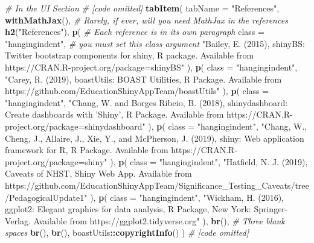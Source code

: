 \documentclass[
]{book}
\newenvironment{Shaded}{\begin{snugshade}}{\end{snugshade}}
\newcommand{\CommentTok}[1]{\textcolor[rgb]{0.56,0.35,0.01}{\textit{#1}}}
\newcommand{\DataTypeTok}[1]{\textcolor[rgb]{0.13,0.29,0.53}{#1}}
\newcommand{\KeywordTok}[1]{\textcolor[rgb]{0.13,0.29,0.53}{\textbf{#1}}}
\newcommand{\NormalTok}[1]{#1}
\newcommand{\OperatorTok}[1]{\textcolor[rgb]{0.81,0.36,0.00}{\textbf{#1}}}
\newcommand{\StringTok}[1]{\textcolor[rgb]{0.31,0.60,0.02}{#1}}
\begin{document}
\begin{Shaded}
\begin{Highlighting}[]
\CommentTok{# In the UI Section}
\CommentTok{# [code omitted]}
\KeywordTok{tabItem}\NormalTok{(}
  \DataTypeTok{tabName =} \StringTok{"References"}\NormalTok{,}
  \KeywordTok{withMathJax}\NormalTok{(), }\CommentTok{# Rarely, if ever, will you need MathJax in the references}
  \KeywordTok{h2}\NormalTok{(}\StringTok{"References"}\NormalTok{),}
  \KeywordTok{p}\NormalTok{( }\CommentTok{# Each reference is in its own paragraph}
    \DataTypeTok{class =} \StringTok{"hangingindent"}\NormalTok{, }\CommentTok{# you must set this class argument}
    \StringTok{"Bailey, E. (2015), shinyBS: Twitter bootstrap components for shiny, R package. Available}
\StringTok{    from https://CRAN.R-project.org/package=shinyBS"}
\NormalTok{    ),}
  \KeywordTok{p}\NormalTok{(}
    \DataTypeTok{class =} \StringTok{"hangingindent"}\NormalTok{,}
    \StringTok{"Carey, R. (2019), boastUtils: BOAST Utilities, R Package. Available from}
\StringTok{    https://github.com/EducationShinyAppTeam/boastUtils"}
\NormalTok{    ),}
  \KeywordTok{p}\NormalTok{(}
    \DataTypeTok{class =} \StringTok{"hangingindent"}\NormalTok{,}
    \StringTok{"Chang, W. and Borges Ribeio, B. (2018), shinydashboard: Create dashboards with 'Shiny', R}
\StringTok{    Package. Available from https://CRAN.R-project.org/package=shinydashboard"}
\NormalTok{    ),}
  \KeywordTok{p}\NormalTok{(}
    \DataTypeTok{class =} \StringTok{"hangingindent"}\NormalTok{,}
    \StringTok{"Chang, W., Cheng, J., Allaire, J., Xie, Y., and McPherson, J. (2019),  shiny: Web }
\StringTok{    application framework for R, R Package. Available from }
\StringTok{    https://CRAN.R-project.org/package=shiny"}
\NormalTok{  ),}
  \KeywordTok{p}\NormalTok{(}
    \DataTypeTok{class =} \StringTok{"hangingindent"}\NormalTok{,}
    \StringTok{"Hatfield, N. J. (2019), Caveats of NHST, Shiny Web App. Available from}
\StringTok{    https://github.com/EducationShinyAppTeam/Significance_Testing_Caveats/tree/PedagogicalUpdate1"}
\NormalTok{  ),}
  \KeywordTok{p}\NormalTok{(}
    \DataTypeTok{class =} \StringTok{"hangingindent"}\NormalTok{,}
    \StringTok{"Wickham, H. (2016), ggplot2: Elegant graphics for data analysis, R Package, New York:}
\StringTok{    Springer-Verlag. Available from https://ggplot2.tidyverse.org"}
\NormalTok{  ),}
  \KeywordTok{br}\NormalTok{(), }\CommentTok{# Three blank spaces}
  \KeywordTok{br}\NormalTok{(),}
  \KeywordTok{br}\NormalTok{(),}
\NormalTok{  boastUtils}\OperatorTok{::}\KeywordTok{copyrightInfo}\NormalTok{()}
\NormalTok{)}
\CommentTok{# [code omitted]}
\end{Highlighting}
\end{Shaded}
\end{document}
